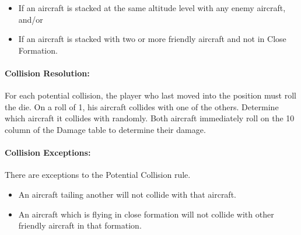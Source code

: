 \begin{itemize}
    \item If an aircraft is stacked at the same altitude level with any enemy aircraft, and/or
    \item If an aircraft is stacked with two or more friendly aircraft and not in Close Formation.
\end{itemize}

\paragraph{Collision Resolution:} For each potential collision, the player who last moved into the position must roll the die. On a roll of 1, his aircraft collides with one of the others. Determine which aircraft it collides with randomly. Both aircraft immediately roll on the 10 column of the Damage table to determine their damage.

\paragraph{Collision Exceptions:} There are  exceptions to the Potential Collision rule.

\begin{itemize}
    \item An aircraft tailing another will not collide with that aircraft.
    \item An aircraft which is flying in close formation will not collide with other friendly aircraft in that formation.
\end{itemize}


